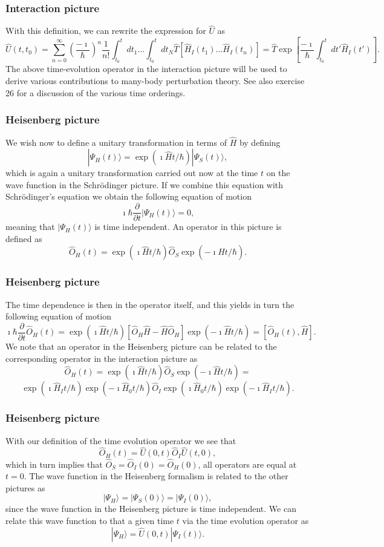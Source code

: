 \documentclass[compress]{beamer}
\begin{document}
\frame
{
\frametitle{Interaction picture}
\begin{small}
{\scriptsize
With this definition, we can rewrite the expression for $\hat{U}$ as 
\[
\hat{U}(t,t_0)=\sum_{n=0}^{\infty}\left(\frac{-\imath}{\hbar}\right)^n\frac{1}{n!}
\int_{t_0}^t dt_1\dots \int_{t_0}^t dt_N \hat{T}\left[\hat{H}_I(t_1)\dots\hat{H}_I(t_n)\right]=\hat{T}\exp{\left[\frac{-\imath}{\hbar}
\int_{t_0}^t dt' \hat{H}_I(t')\right]}.
\]
The above time-evolution operator in the interaction picture will be used
to derive various contributions to many-body perturbation theory. See also exercise 26 for a discussion of the various time orderings.
}
\end{small}
}
\frame
{
\frametitle{Heisenberg picture}
\begin{small}
{\scriptsize
We wish now to define a unitary transformation in terms of $\hat{H}$ by defining
\[
|\Psi_H(t)\rangle = \exp{(\imath\hat{H}t/\hbar)}|\Psi_S(t)\rangle,
\]
which is again a unitary transformation carried out now at the time $t$ on the 
wave function in the Schr\"odinger picture. If we combine this equation with 
Schr\"odinger's equation we obtain the following equation of motion
\[
\imath \hbar\frac{\partial }{\partial t}|\Psi_H(t)\rangle = 0,
\]
meaning that $|\Psi_H(t)\rangle$ is time independent. An operator in this picture is defined as
\[
\hat{O}_H(t)=
\exp{(\imath\hat{H}t/\hbar)}\hat{O}_S\exp{(-\imath\hat{H}t/\hbar)}.
\]
}
\end{small}
}
\frame
{
\frametitle{Heisenberg picture}
\begin{small}
{\scriptsize
The time dependence is then in the operator itself, and this yields in turn the
following equation of motion
\[
\imath \hbar\frac{\partial }{\partial t}\hat{O}_H(t) = \exp{(\imath\hat{H}t/\hbar)}\left[\hat{O}_H\hat{H}-\hat{H}\hat{O}_H\right]\exp{(-\imath\hat{H}t/\hbar)}=\left[\hat{O}_H(t),\hat{H}\right].
\]
We note that an operator in the Heisenberg picture can be related to the corresponding
operator in the interaction picture as 
\[
\hat{O}_H(t)=
\exp{(\imath\hat{H}t/\hbar)}\hat{O}_S\exp{(-\imath\hat{H}t/\hbar)}=\]
\[
\exp{(\imath\hat{H}_It/\hbar)}\exp{(-\imath\hat{H}_0t/\hbar)}\hat{O}_I\exp{(\imath\hat{H}_0t/\hbar)}\exp{(-\imath\hat{H}_It/\hbar)}.
\]
}
\end{small}
}
\frame
{
\frametitle{Heisenberg picture}
\begin{small}
{\scriptsize
With our definition of the time evolution operator we see that
\[
\hat{O}_H(t)=\hat{U}(0,t)\hat{O}_I\hat{U}(t,0),
\]
which in turn implies that $\hat{O}_S=\hat{O}_I(0)=\hat{O}_H(0)$, all operators are equal at $t=0$. The wave function in the Heisenberg formalism is 
related to the other pictures as 
\[
|\Psi_H\rangle=|\Psi_S(0)\rangle=|\Psi_I(0)\rangle,
\]
since the wave function in the Heisenberg picture is time independent. 
We can relate this wave function to that a given time $t$ via the time evolution operator as
\[
|\Psi_H\rangle=\hat{U}(0,t)|\Psi_I(t)\rangle.
\]
}
\end{small}
}
\end{document}
